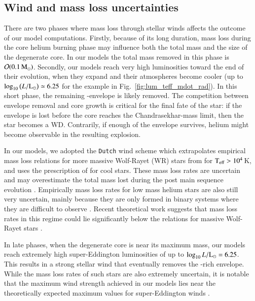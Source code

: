 \documentclass[main.tex]{subfiles}
\begin{document}
\subsection{Wind and mass loss uncertainties}\label{sec:series2_grid}
There are two phases where mass loss through stellar winds  affects the outcome of our model computations. Firstly, 
because of its long duration, mass loss during the core helium burning 
phase may influence both the total mass and the size of the degenerate core. In our  \seriesone models the total mass removed in this phase is $\mathcal{O}(0.1\mathrm{\,M_\odot})$. Secondly, our models reach very high 
luminosities toward the end of their evolution, when they expand and 
their atmospheres become cooler (up to $\log_{10} \left(L/{\rm L}_\odot \right) \simeq 6.25$ 
for the example in Fig.~\ref{fig:lum_teff_mdot_rad}). In this short phase, the 
remaining -envelope is likely removed. The competition between envelope removal and core growth is critical for the final fate of the
star: if the envelope is lost before the core reaches the Chandrasekhar-mass limit, then the star  becomes a WD. Contrarily, if enough of the envelope survives, helium might become observable in the resulting explosion.  

In our models, we adopted the \texttt{Dutch} \mesa wind scheme which  extrapolates empirical 
mass loss relations for more massive Wolf-Rayet (WR) stars from \cite{Nugis2000} for $\rm 
T_{\text{eff}} > 10^4$\,K, and uses the prescription of \cite{deJager1988} for cool stars. These 
mass loss rates are  uncertain and may  overestimate the total mass lost during the post main sequence evolution \citep{Beasor2021arx}. Empirically mass loss rates for low mass 
helium stars are also still very uncertain, mainly because they are only formed in binary systems where they are difficult to observe \citep{Smith2017,Zapartas2017}. Recent
theoretical work suggests that  mass loss rates in this regime could lie significantly below the relations for massive Wolf-Rayet stars \citep{Graefener2017,Vink:2017ujd}. 

In late phases, when the degenerate core is near its maximum mass, our models reach extremely high 
super-Eddington luminosities of up to $\log_{10}{L/{\rm L}_\odot = 6.25}$.
This results in a strong stellar wind that eventually removes the -rich envelope. While the mass loss rates of such stars are also extremely uncertain, it is notable that the maximum wind strength achieved in our models lies  near the theoretically expected maximum values for super-Eddington winds \citep[][]{Owocki:2004zz,Smith2006}. 
\end{document}
